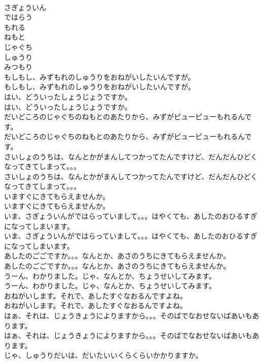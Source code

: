 \documentclass[8pt]{extreport}
\begin{document}
\begin{CJK}{UTF8}{min}
\\	さぎょういん
\\	ではらう
\\	もれる
\\	ねもと
\\	じゃぐち
\\	しゅうり
\\	みつもり
\\	もしもし、みずもれのしゅうりをおねがいしたいんですが。
\\	もしもし、みずもれのしゅうりをおねがいしたいんですが。
\\	はい、どういったしょうじょうですか。
\\	はい、どういったしょうじょうですか。
\\	だいどころのじゃぐちのねもとのあたりから、みずがピューピューもれるんです。
\\	だいどころのじゃぐちのねもとのあたりから、みずがピューピューもれるんです。
\\	さいしょのうちは、なんとかがまんしてつかってたんですけど、だんだんひどくなってきてしまって。。。
\\	さいしょのうちは、なんとかがまんしてつかってたんですけど、だんだんひどくなってきてしまって。。。
\\	いますぐにきてもらえませんか。
\\	いますぐにきてもらえませんか。
\\	いま、さぎょういんがではらっていまして。。。はやくても、あしたのおひるすぎになってしまいます。
\\	いま、さぎょういんがではらっていまして。。。はやくても、あしたのおひるすぎになってしまいます。
\\	あしたのごごですか。。。なんとか、あさのうちにきてもらえませんか。
\\	あしたのごごですか。。。なんとか、あさのうちにきてもらえませんか。
\\	うーん、わかりました。じゃ、なんとか、ちょうせいしてみます。
\\	うーん、わかりました。じゃ、なんとか、ちょうせいしてみます。
\\	おねがいします。それで、あしたすぐなおるんですよね。
\\	おねがいします。それで、あしたすぐなおるんですよね。
\\	はぁ、それは、じょうきょうによりますから。。。そのばでなおせないばあいもあります。
\\	はぁ、それは、じょうきょうによりますから。。。そのばでなおせないばあいもあります。
\\	じゃ、しゅうりだいは、だいたいいくらくらいかかりますか。

\end{CJK}
\end{document}
